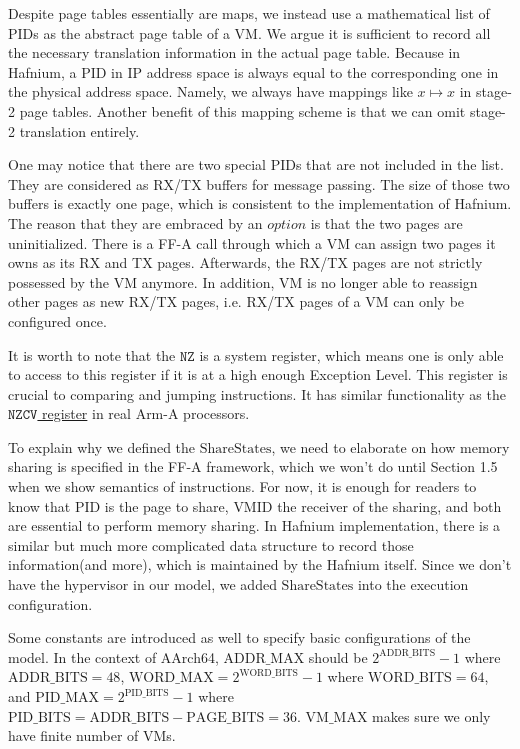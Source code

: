 \documentclass[a4paper]{article}
\newcommand*{\SSS}{\text{ShareStates}}
\newcommand*{\PID}{\text{PID}}
\newcommand*{\VMID}{\text{VMID}}
\newcommand*{\PABITS}{\text{ADDR\_BITS}}
\newcommand*{\PPBITS}{\text{PAGE\_BITS}}
\newcommand*{\PPIDBITS}{\text{PID\_BITS}}
\newcommand*{\PAMAX}{\text{ADDR\_MAX}}
\newcommand*{\PPIDMAX}{\text{PID\_MAX}}
\newcommand*{\PWBITS}{\text{WORD\_BITS}}
\newcommand*{\PWMAX}{\text{WORD\_MAX}}
\newcommand*{\PVMMAX}{\text{VM\_MAX}}
\begin{document}
Despite page tables essentially are maps, we instead use a mathematical list of
$\PID$s as the abstract page table of a VM.
We argue it is sufficient to record all the necessary translation
information in the actual page table. Because in Hafnium, a $\PID$ in IP address
space is always equal to the corresponding one in the physical address space.
Namely, we always have mappings like $x \mapsto x$ in stage-2 page tables.
Another benefit of this mapping scheme is that we can omit stage-2 translation entirely.

One may notice that there are two special $\PID$s that are not included in the
list. They are considered as RX/TX buffers for message passing. The size of
those two buffers is exactly one page, which is consistent to the
implementation of Hafnium. The reason that they are embraced by an $option$ is
that the two pages are uninitialized. There is a FF-A call through which a VM
can assign two pages it owns as its RX and TX pages. Afterwards, the RX/TX pages
are not strictly possessed by the VM anymore. In addition, VM is no longer able to
reassign other pages as new RX/TX pages, i.e. RX/TX pages of a VM can only be
configured once. 

It is worth to note that the $\mathtt{NZ}$ is a system register, which means one
is only able to access to this register if it is at a high enough Exception
Level. This register is crucial to comparing and jumping instructions. It has
similar functionality as the
\href{https://developer.arm.com/docs/ddi0595/h/aarch64-system-registers/nzcv}
{$\mathtt{NZCV}$ register} in real Arm-A processors.

To explain why we defined the $\SSS$, we need to elaborate on how memory sharing is
specified in the FF-A framework, which we won't do until Section 1.5 when we
show semantics of instructions. For now, it is enough for readers to know that $\PID$ is
the page to share, $\VMID$ the receiver of the sharing, and both are essential
to perform memory sharing. In Hafnium implementation, there is a similar but
much more complicated data structure to record those information(and more),
which is maintained by the Hafnium itself. Since we don't have the hypervisor in
our model, we added $\SSS$ into the execution configuration.

Some constants are introduced as well to specify basic configurations of the model. In
the context of AArch64, $\PAMAX$ should be $2^{\PABITS} - 1$ where
$\PABITS = 48$, $\PWMAX = 2^{\PWBITS} -1$ where $\PWBITS = 64$, and
$\PPIDMAX = 2^{\PPIDBITS}-1$ where $\PPIDBITS = \PABITS - \PPBITS = 36$.
$\PVMMAX$ makes sure we only have finite number of VMs.
\end{document}
